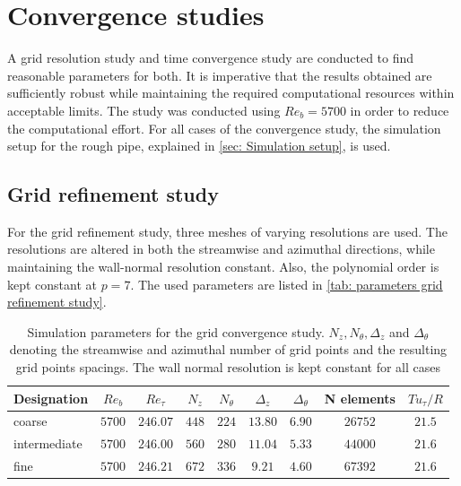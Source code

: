 \section{Convergence studies} \label{sec: convergence studies}
A grid resolution study and  time convergence study are conducted to find reasonable parameters for both.
It is imperative that the results obtained are sufficiently robust while maintaining the required computational resources within acceptable limits.
The study was conducted using $Re_b = 5700$ in order to reduce the computational effort.
For all cases of the convergence study, the simulation setup for the rough pipe, explained in \autoref{sec: Simulation setup}, is used.

\subsection{Grid refinement study}\label{subsec: grid refinement study}
For the grid refinement study, three meshes of varying resolutions are used.
The resolutions are altered in both the streamwise and azimuthal directions, while maintaining the wall-normal resolution constant.
Also, the polynomial order is kept constant at $p = 7$.
The used parameters are listed in \autoref{tab: parameters grid refinement study}.
\begin{table}
\centering
\caption{Simulation parameters for the grid convergence study. $N_z, N_\theta, \Delta_z$ and $\Delta_\theta$ denoting the streamwise and azimuthal number of grid points and the resulting grid points spacings. The wall normal resolution is kept constant for all cases}
\begin{tabular}{l c c c c c c c c } 
\hline
Designation     & $Re_b$    & $Re_\tau$     & $N_z$     & $N_{\theta}$  & $\Delta_z$    & $\Delta_\theta$   & N elements & $Tu_\tau / R$\\
\hline
coarse          & $5700$     & $246.07$      & $448$     & $224$         & $13.80$       & $6.90$            & $26752$    & $21.5$\\ 
intermediate    & $5700$     & $246.00$      & $560$     & $280$         & $11.04$       & $5.33$            & $44000$    & $21.6$\\ 
fine            & $5700$     & $246.21$      & $672$     & $336$         & $9.21$        & $4.60$            & $67392$    & $21.6$\\ 
\hline
\end{tabular}
\label{tab: parameters grid refinement study}
\end{table}

